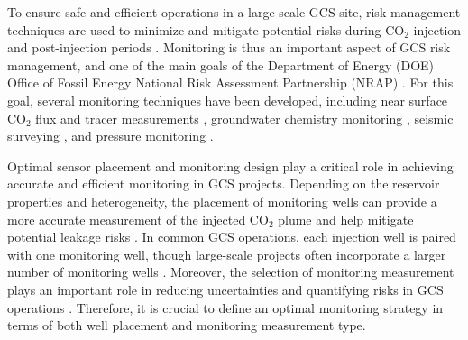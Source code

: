 \documentclass[a4paper,fleqn]{cas-sc}
\begin{document}
To ensure safe and efficient operations in a large-scale GCS site, risk management techniques are used to minimize and mitigate potential risks during CO$_2$ injection and post-injection periods \citep{Nicot2013388, Onishi201944, Dai20143908, Zhang20111631, Chadwick20051385}. Monitoring is thus an important aspect of GCS risk management, and one of the main goals of the Department of Energy (DOE) Office of Fossil Energy National Risk Assessment Partnership (NRAP) \citep{Pawar2016175}. For this goal, several monitoring techniques have been developed, including near surface CO$_2$ flux and tracer measurements \citep{Yang2012185, Ren2016108}, groundwater chemistry monitoring \citep{Dai2014, Yang20158887}, seismic surveying \citep{Ren2016108, Zhang20151, Chadwick2006303, Grana2017296}, and pressure monitoring \citep{Keating20144163, Wang2014188, Azzolina2014895, Oruganti20114140, Senel20134598}. 

Optimal sensor placement and monitoring design play a critical role in achieving accurate and efficient monitoring in GCS projects. Depending on the reservoir properties and heterogeneity, the placement of monitoring wells can provide a more accurate measurement of the injected CO$_2$ plume and help mitigate potential leakage risks \citep{Sun2019, Tang2022, Ma2022, Nwachukwu2018}. In common GCS operations, each injection well is paired with one monitoring well, though large-scale projects often incorporate a larger number of monitoring wells \citep{ButlerJr.19993553, Cardiff2012, Brauchler20132013}. Moreover, the selection of monitoring measurement plays an important role in reducing uncertainties and quantifying risks in GCS operations \citep{Chen2020, Sun2013, Seto2011845, Yang20158887, Yonkofski2016}. Therefore, it is crucial to define an optimal monitoring strategy in terms of both well placement and monitoring measurement type. 
\end{document}
